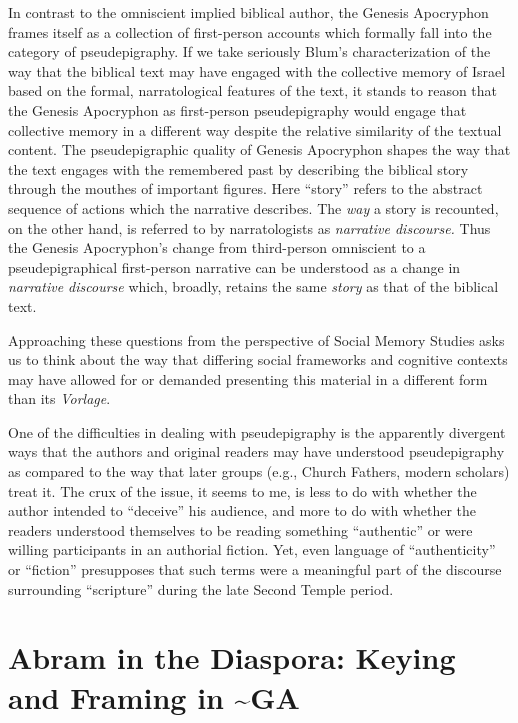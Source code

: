 In contrast to the omniscient implied biblical author, the
Genesis Apocryphon frames itself as a collection of first-person
accounts which formally fall into the category of pseudepigraphy. If we
take seriously Blum's characterization of the way that the biblical text
may have engaged with the collective memory of Israel based on the
formal, narratological features of the text, it stands to reason that
the Genesis Apocryphon as first-person pseudepigraphy would engage that
collective memory in a different way despite the relative similarity of
the textual content. The pseudepigraphic quality of Genesis Apocryphon
shapes the way that the text engages with the remembered past by
describing the biblical story through the mouthes of important figures.
Here ``story'' refers to the abstract sequence of actions which the
narrative describes. The \emph{way} a story is recounted, on the other
hand, is referred to by narratologists as \emph{narrative discourse.}
Thus the Genesis Apocryphon's change from third-person omniscient to a
pseudepigraphical first-person narrative can be understood as a change
in \emph{narrative discourse} which, broadly, retains the same
\emph{story} as that of the biblical text.

Approaching these questions from the perspective of Social Memory
Studies asks us to think about the way that differing social frameworks
and cognitive contexts may have allowed for or demanded presenting this
material in a different form than its \emph{Vorlage}.

One of the difficulties in dealing with pseudepigraphy is the apparently
divergent ways that the authors and original readers may have understood
pseudepigraphy as compared to the way that later groups (e.g., Church
Fathers, modern scholars) treat it. The crux of the issue, it seems to
me, is less to do with whether the author intended to ``deceive'' his
audience, and more to do with whether the readers understood themselves
to be reading something ``authentic'' or were willing participants in an
authorial fiction. Yet, even language of ``authenticity'' or ``fiction''
presupposes that such terms were a meaningful part of the discourse
surrounding ``scripture'' during the late Second Temple period.

\hypertarget{abram-in-the-diaspora-keying-and-framing-in-ga}{%
\section{Abram in the Diaspora: Keying and Framing in
\textasciitilde{}GA}\label{abram-in-the-diaspora-keying-and-framing-in-ga}}

